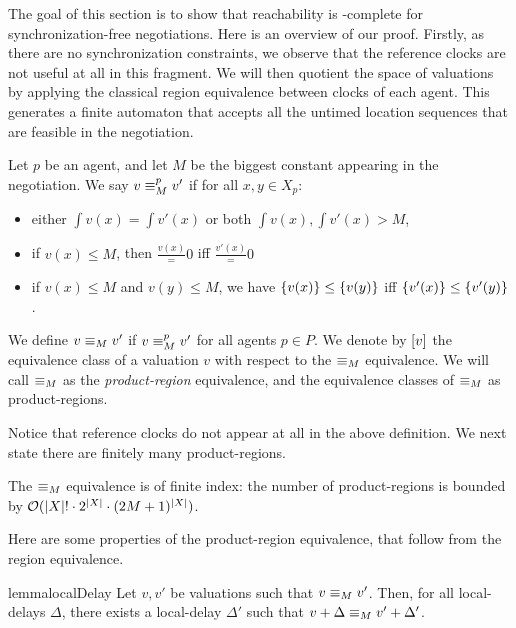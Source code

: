 The goal of this section is to show that reachability is
\PSPACE-complete for synchronization-free negotiations. Here is an
overview of our proof. Firstly, as there are no synchronization
constraints, we observe that the reference clocks are not useful at
all in this fragment. We will then quotient the space of valuations by
applying the classical region equivalence between clocks of each
agent. This generates a finite automaton that accepts all the untimed
location sequences that are feasible in the negotiation.

\begin{definition}
  Let $p$ be an agent, and let $M$ be the biggest constant appearing
  in the negotiation. We say $v \preg v'$ if for all $x, y \in X_p$:
  \begin{itemize}
  \item either $\int{v(x)} = \int{v'(x)}$ or both
    $\int{v(x)}, \int{v'(x)} > M$,
  \item if $v(x) \le M$, then $\frac{v(x)} = 0$ iff $\frac{v'(x)} = 0$
    
  \item if $v(x) \le M$ and $v(y) \le M$, we have
    $\frac{v(x)} \le \frac{v(y)}$ iff $\frac{v'(x)} \le \frac{v'(y)}$.
  \end{itemize}
  We define $v \reg v'$ if $v \preg v'$ for all agents $p \in P$. We
  denote by $\region{v}$ the equivalence class of a valuation $v$ with
  respect to the $\reg$ equivalence. We will call $\reg$ as the
  \emph{product-region} equivalence, and the equivalence classes of
  $\reg$ as product-regions.
\end{definition}

Notice that reference clocks do not appear at all in the above
definition. We next state there are finitely many product-regions.

\begin{lemma}\label{lem:size-of-product-regions}
The $\reg$ equivalence is of finite index: the number of
product-regions is bounded by $\Oo(|X|! \cdot 2^{|X|} \cdot
(2M + 1)^{|X|})$.
\end{lemma}


Here are some properties of the product-region equivalence, that
follow from the region equivalence.



\begin{restatable}{lemma}{localDelay}
\label{lemma:region-local-delay}
  Let $v, v'$ be valuations such that $v \reg v'$. Then, for all
  local-delays $\Delta$, there exists a local-delay $\Delta'$ such
  that $v + \Delta \reg v' + \Delta'$.
\end{restatable}



